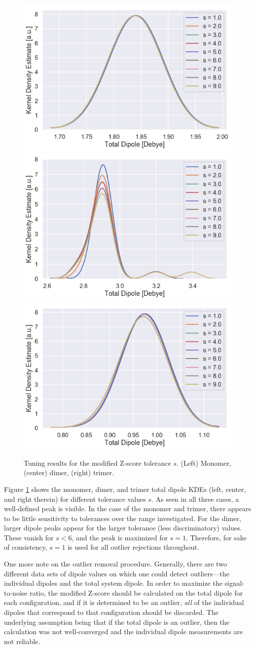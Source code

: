         
        
        \begin{figure}
            \centering
            \includegraphics[width=0.3\linewidth]{Figures/System/pc_m_scan_monomer.png}\hfill
            \includegraphics[width=0.3\linewidth]{Figures/System/pc_m_scan_dimer.png}\hfill
            \includegraphics[width=0.3\linewidth]{Figures/System/pc_m_scan_trimer.png}\hfill
            \caption{Tuning results for the modified Z-score tolerance $s$. (Left) Monomer, (center) dimer, (right) trimer.}
            \label{fig:m_scan}
        \end{figure}
        
        Figure \ref{fig:m_scan} shows the monomer, dimer, and trimer total dipole KDEs (left, center, and right therein) for different tolerance values $s$. As seen in all three cases, a well-defined peak is visible. In the case of the monomer and trimer, there appears to be little sensitivity to tolerances over the range investigated. For the dimer, larger dipole peaks appear for the larger tolerance (less discriminatory) values. These vanish for $s<6$, and the peak is maximized for $s=1$. Therefore, for sake of consistency, $s=1$ is used for all outlier rejections throughout.
        
        One more note on the outlier removal procedure. Generally, there are two different data sets of dipole values on which one could detect outliers---the individual dipoles and the total system dipole. In order to maximize the signal-to-noise ratio, the modified Z-score should be calculated on the total dipole for each configuration, and if it is determined to be an outlier, \textit{all} of the individual dipoles that correspond to that configuration should be discarded. The underlying assumption being that if the total dipole is an outlier, then the calculation was not well-converged and the individual dipole measurements are not reliable.
        
